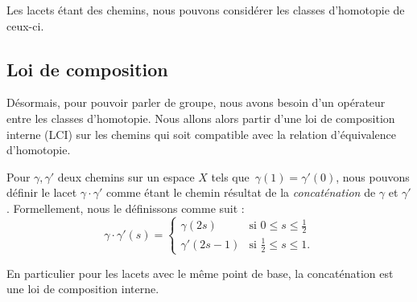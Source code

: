 Les lacets étant des chemins, nous pouvons considérer les classes d'homotopie de ceux-ci.

\subsection{Loi de composition}

Désormais, pour pouvoir parler de groupe, nous avons besoin d'un opérateur entre les classes d'homotopie. Nous allons alors partir d'une loi de composition interne (LCI) sur les chemins qui soit compatible avec la relation d'équivalence d'homotopie.

\begin{figure}
    \centering
\end{figure}

\phantom{}
\begin{definition}
Pour $\gamma,\gamma'$ deux chemins sur un espace $X$ tels que~$\gamma(1)=\gamma'(0)$, nous pouvons définir le lacet $\gamma\cdot\gamma'$ comme étant le chemin résultat de la \emph{concaténation} de $\gamma$ et $\gamma'$. Formellement, nous le définissons comme suit : \[\gamma\cdot \gamma'(s)=\left\{\begin{matrix}
\gamma(2s)&\text{si }0\leq s\leq \frac{1}{2}\\ 
\gamma'(2s-1)&\text{si }\frac{1}{2}\leq s\leq 1.
\end{matrix}\right.\]

En particulier pour les lacets avec le même point de base, la concaténation est une loi de composition interne.
\end{definition}


